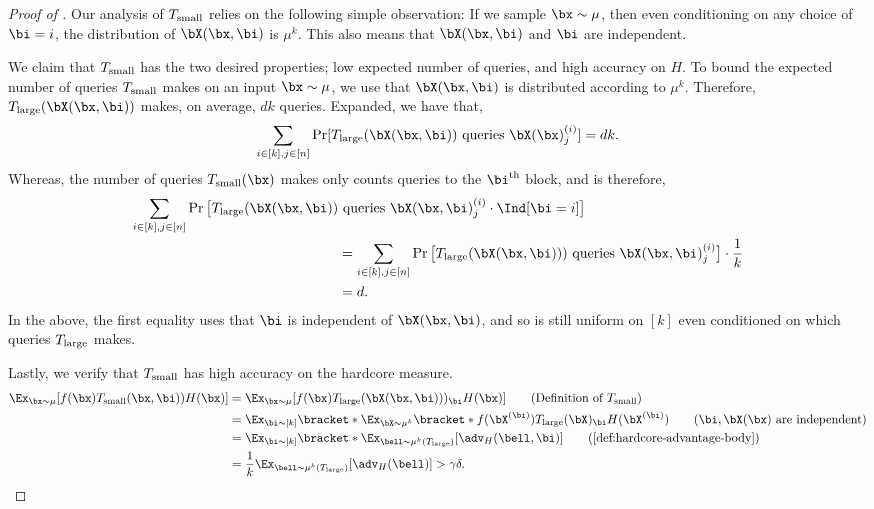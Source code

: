 \begin{proof}[Proof of ]
    Our analysis of $T_{\textnormal{small}}$ relies on the following simple observation: If we sample $\bx \sim \mu$, then even conditioning on any choice of $\bi = i$, the distribution of $\bX(\bx, \bi)$ is $\mu^k$. This also means that $\bX(\bx, \bi)$ and $\bi$ are independent.

    We claim that $T_{\textnormal{small}}$ has the two desired properties; low expected number of queries, and high accuracy on $H$. To bound the expected number of queries $T_{\textnormal{small}}$ makes on an input $\bx \sim \mu$, we use that $\bX(\bx, \bi)$ is distributed according to $\mu^k$. Therefore, $T_{\textnormal{large}}(\bX(\bx, \bi))$ makes, on average, $dk$ queries. Expanded, we have that,
    \begin{equation*}
        \sum_{i \in [k], j\in [n]}\Pr[T_{\textnormal{large}}(\bX(\bx, \bi))\text{ queries }\bX(\bx)^{(i)}_j] = dk.
    \end{equation*}
    Whereas, the number of queries $T_{\textnormal{small}}(\bx)$ makes only counts queries to the $\bi^{\text{th}}$ block, and is therefore,
    \begin{align*}
         \sum_{i \in [k], j\in [n]}\Pr\big[T_{\textnormal{large}}(\bX(\bx, \bi))&\text{ queries }\bX(\bx, \bi)^{(i)}_j \cdot \Ind[\bi = i]\big] \\
         &= \sum_{i \in [k], j\in [n]}\Pr\big[T_{\textnormal{large}}(\bX(\bx, \bi)))\text{ queries }\bX(\bx, \bi)^{(i)}_j\big] \cdot \frac{1}{k}\\
         &= d.
    \end{align*}
    In the above, the first equality uses that $\bi$ is independent of $\bX(\bx, \bi)$, and so is still uniform on $[k]$ even conditioned on which queries $T_{\textnormal{large}}$ makes.

    Lastly, we verify that $T_{\textnormal{small}}$ has high accuracy on the hardcore measure.
    \begin{align*}
        \Ex_{\bx \sim \mu}[ f(\bx) T_{\textnormal{small}}(\bx, \bi)) H(\bx)] &= \Ex_{\bx \sim \mu}[ f(\bx) T_{\textnormal{large}}(\bX(\bx, \bi)))_{\bi} H(\bx)] \tag{Definition of $T_{\textnormal{small}}$}  \\
        &=\Ex_{\bi \sim [k]}\bracket*{\Ex_{\bX \sim \mu^k}\bracket*{f(\bX^{(\bi)}) T_{\textnormal{large}}(\bX)_{\bi} H(\bX^{(\bi)})}} \tag{$\bi, \bX(\bx)$ are independent} \\
        &= \Ex_{\bi \sim [k]}\bracket*{\Ex_{\bell \sim \mu^k(T_{\textnormal{large}})}[\adv_H(\bell, \bi)]} \tag{\Cref{def:hardcore-advantage-body}}\\
        &= \frac{1}{k}\Ex_{\bell \sim \mu^k(T_{\textnormal{large}})}[\adv_H(\bell)] > \gamma \delta. \tag*{\qedhere}
    \end{align*}
\end{proof}








